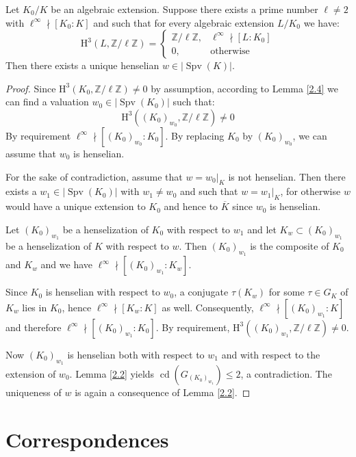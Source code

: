 \begin{proposition}\label{2.6}
Let $K_0/K$ be an algebraic extension. Suppose there exists a prime number $\ell\neq 2$ with $\ell^\infty\nmid[K_0:K]$ and such that for every algebraic extension $L/K_0$ we have: 
\[ \mathrm{H}^3(L,\mathbb{Z}/\ell\mathbb{Z}) = \begin{cases}
\mathbb{Z}/\ell\mathbb{Z}, & \ell^\infty\nmid [L:K_0]\\
0, & \text{otherwise}
\end{cases} \]
Then there exists a unique henselian $w\in|\operatorname{Spv}(K)|$.
\end{proposition}

\begin{proof}
Since $\mathrm{H}^3(K_0, \mathbb{Z}/\ell\mathbb{Z})\neq 0$ by assumption, according to Lemma \ref{2.4} we can find a valuation $w_0\in|\operatorname{Spv}(K_0)|$ such that:
\[ \mathrm{H}^3((K_0)_{w_0}, \mathbb{Z}/\ell\mathbb{Z}) \neq 0 \]
By requirement $\ell^\infty \nmid [(K_0)_{w_0} : K_0]$. By replacing $K_0$ by $(K_0)_{w_0}$, we can assume that $w_0$ is henselian.

For the sake of contradiction, assume that $w = w_0|_K$ is not henselian. Then there exists a $w_1\in|\operatorname{Spv}(K_0)|$ with $w_1\neq w_0$ and such that $w = w_1|_K$, for otherwise $w$ would have a unique extension to $K_0$ and hence to $\overline{K}$ since $w_0$ is henselian.

Let $(K_0)_{w_1}$ be a henselization of $K_0$ with respect to $w_1$ and let $K_w\subset (K_0)_{w_1}$ be a henselization of $K$ with respect to $w$. Then $(K_0)_{w_1}$ is the composite of $K_0$ and $K_w$ and we have $\ell^\infty\nmid [(K_0)_{w_1} : K_w]$.

Since $K_0$ is henselian with respect to $w_0$, a conjugate $\tau(K_w)$ for some $\tau\in G_K$ of $K_w$ lies in $K_0$, hence $\ell^\infty\nmid [K_w : K]$ as well. Consequently, $\ell^\infty \nmid [(K_0)_{w_1} : K]$ and therefore $\ell^\infty \nmid [(K_0)_{w_1} : K_0]$. By requirement, $\mathrm{H}^3((K_0)_{w_1}, \mathbb{Z}/\ell\mathbb{Z}) \neq 0$.

Now $(K_0)_{w_1}$ is henselian both with respect to $w_1$ and with respect to the extension of $w_0$. Lemma \ref{2.2} yields $\operatorname{cd}(G_{(K_0)_{w_1}})\leq 2$, a contradiction. The uniqueness of $w$ is again a consequence of Lemma \ref{2.2}.
\end{proof}

\chapter{Correspondences}


